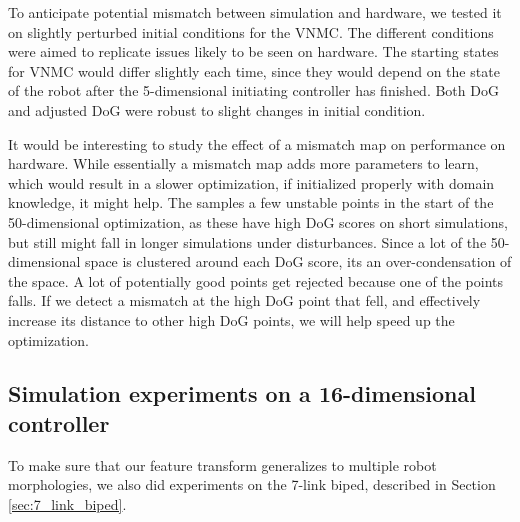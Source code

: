 To anticipate potential mismatch between simulation and hardware, we tested it on slightly perturbed initial conditions for the VNMC. The different conditions were aimed to replicate issues likely to be seen on hardware. The starting states for VNMC would differ slightly each time, since they would depend on the state of the robot after the 5-dimensional initiating controller has finished. Both DoG and adjusted DoG were robust to slight changes in initial condition. 

It would be interesting to study the effect of a mismatch map on performance on hardware. While essentially a mismatch map adds more parameters to learn, which would result in a slower optimization, if initialized properly with domain knowledge, it might help. The \dogkernel samples a few unstable points in the start of the 50-dimensional optimization, as these have high DoG scores on short simulations, but still might fall in longer simulations under disturbances. Since a lot of the 50-dimensional space is clustered around each DoG score, its an over-condensation of the space. A lot of potentially good points get rejected because one of the points falls. If we detect a mismatch at the high DoG point that fell, and effectively increase its distance to other high DoG points, we will help speed up the optimization.


\subsection{Simulation experiments on a 16-dimensional controller}
\label{sec:probform}
To make sure that our feature transform generalizes to multiple robot morphologies, we also did experiments on the 7-link biped, described in Section \ref{sec:7_link_biped}.

